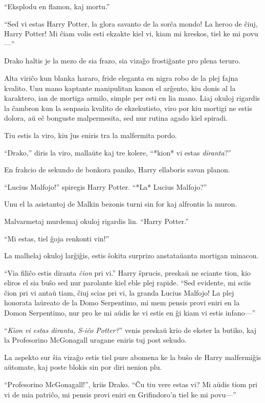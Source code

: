 ``Eksplodu en flamon, kaj mortu.''

``Sed vi estas Harry Potter, la glora savanto de la sorĉa mondo! La
heroo de ĉiuj, Harry Potter! Mi ĉiam volis esti ekzakte kiel vi, kiam
mi kreskos, tiel ke mi povu—''

Drako haltis je la mezo de sia frazo, sia vizaĝo frostiĝante pro plena
teruro.

Alta viriĉo kun blanka hararo, fride eleganta en nigra robo de la plej
fajna kvalito. Unu mano kaptante manipulitan kanon el arĝento, kiu
donis al la karaktero, ian de mortiga armilo, simple per esti en lia
mano. Liaj okuloj rigardis la ĉambron kun la senpasia kvalito de
ekzekutisto, viro por kiu mortigi ne estis dolora, aŭ eĉ bonguste
malpermesita, sed nur rutina agado kiel spiradi.

Tiu estis la viro, kiu ĵus eniris tra la malfermita pordo.


``Drako,'' diris la viro, mallaŭte kaj tre kolere, ``*kion* vi estas
\emph{diranta}?''

En frakcio de sekundo de bonkora paniko, Harry ellaboris savan planon.

``Lucius Malfojo!'' spiregis Harry Potter. ``*La* Lucius Malfojo?''

Unu el la asistantoj de Malkin bezonis turni sin for kaj alfrontis la muron.

Malvarmetaj murdemaj okuloj rigardis lin. ``Harry Potter.''

``Mi estas, tiel ĝoja renkonti vin!''

La malhelaj okuloj larĝiĝis, estis ŝokita surprizo anstataŭanta mortigan
minacon.

``Via filiĉo estis diranta \emph{ĉion} pri vi.'' Harry ŝprucis,
preskaŭ ne sciante tion, kio eliros el sia buŝo sed nur parolante kiel
eble plej rapide. ``Sed evidente, mi sciis ĉion pri vi antaŭ tiam,
ĉiuj scias pri vi, la granda Lucius Malfojo! La plej honorata laŭreato
de la Domo Serpentimo, mi mem pensis provi eniri en la Domon
Serpentimo, nur pro ke mi aŭdis ke vi estis en ĝi kiam vi estis
infano—''

``\emph{Kion vi estas diranta, S-iĉo Potter?}'' venis preskaŭ krio de
ekster la butiko, kaj la Profesorino McGonagall uragane eniris tuj
post sekudo.

La aspekto sur ŝia vizaĝo estis tiel pure abomena ke la buŝo de Harry
malfermiĝis aŭtomate, kaj poste blokis sin por diri nenion plu.

``Profesorino McGonagall!'', kriis Drako. ``Ĉu tiu vere estas vi? Mi
aŭdis tiom pri vi de mia patriĉo, mi pensis provi eniri en Grifindoro'n
tiel ke mi povu—''

